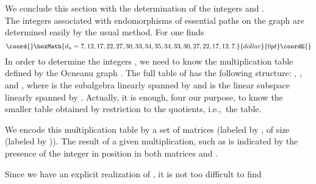 \documentclass[a4paper,11pt]{article}
\def\ie{{\rm i.e.,\/}\ }
\providecommand{\ud}[1]{\underline{#1}}
\begin{document}
We conclude this section with the determination of the integers \coordHE{} and
\coordHE{}.\\
The integers \coordHE{} associated with endomorphisms of essential paths
on the graph \coordHE{} are determined easily by the usual method.
For \coordHE{} one finds
$$\coord{}\boxMath{
d_{n} = 7,12,17,22,27,30,33,34,35,34,33,30,27,22,17,12,7.
}{dollar}{0pt}\coordE{}$$
In order to determine the integers \coordHE{}, we need to know the
multiplication table defined by the Ocneanu graph \coordHE{}.
   The full table of \coordHE{} has the
following structure: \coordHE{},
\coordHE{}, and
\coordHE{}, where \coordHE{} is the
subalgebra linearly spanned by \myHighlight{$\ud{0}, \ud{1}, \ldots, \ud{8}, \ud{8^{'}}$}\coordHE{} and
\coordHE{} is the linear subspace  linearly spanned by \myHighlight{$\ud{(0)},
\ud{(1)}, \ldots,
\ud{(6)}$}\coordHE{}. Actually, it is enough, four our purpose, to know the smaller table
obtained by restriction to the \coordHE{} quotients, \ie the
\coordHE{} table.

We encode this multiplication table by a set of \coordHE{} matrices \coordHE{}
(labeled by
\coordHE{}, of size \coordHE{} (labeled by \coordHE{})).
The result of a given multiplication, such as
\myHighlight{$\ud{(4)} \times \ud{(5)} = \ud{3} + \ud{7}$}\coordHE{}
is indicated by the presence of the integer \coordHE{} in position \coordHE{} in both
matrices \coordHE{} and \coordHE{}.

Since we have an explicit realization of \coordHE{}, it is not too
difficult to find
\end{document}
